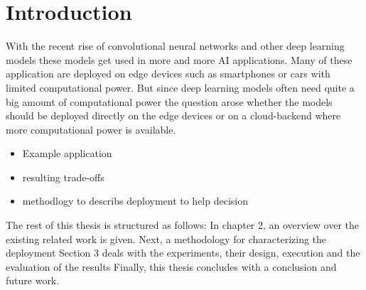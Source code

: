 \chapter{Introduction}
With the recent rise of convolutional neural networks and other deep learning models these models get used in more and more AI applications. Many of these application are deployed on edge devices such as smartphones or cars with limited computational power. But since deep learning models often need quite a big amount of computational power the question arose whether the models should be deployed directly on the edge devices or on a cloud-backend where more computational power is available. 

\begin{itemize}
    \item Example application
    \item resulting trade-offs
    \item methodlogy to describs deployment to help decision
\end{itemize}
The rest of this thesis is structured as follows: In chapter 2, an overview over the existing related work is given. Next, a methodology for characterizing the deployment
Section 3 deals with the experiments, their design, execution and the evaluation of the results
Finally, this thesis concludes with a conclusion and future work.



\endinput 
